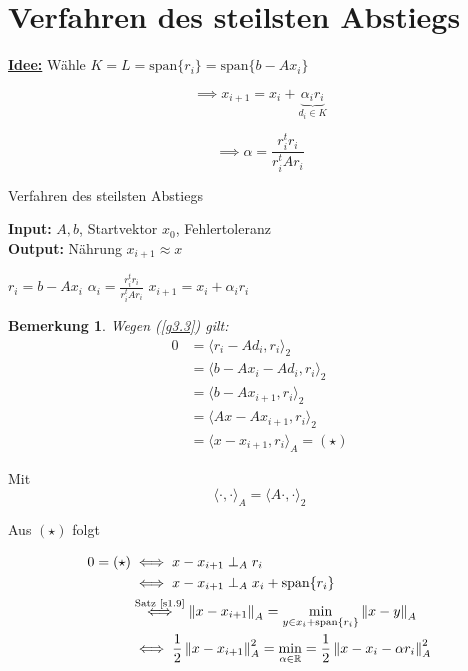 \documentclass{book}
\newtheorem{remark}[algorithm]{Bemerkung}
\def\R{\mathbb{R}}
\begin{document}
        \section{Verfahren des steilsten Abstiegs}

            \underline{\textbf{Idee:}} Wähle $K=L=\text{span}\{r_i\}=\text{span}\{b-Ax_i\}$

            \[\implies x_{i+1}=x_i+\underbrace{\alpha_i r_i}_{d_i\in K}\]

            \[\implies \alpha = \frac{r_i^tr_i}{r_i^tAr_i}\]
            
            \begin{algorithm}[H]
                \caption{Verfahren des steilsten Abstiegs}\label{a3.5}
                \textbf{Input:} $A,b$, Startvektor $x_0$, Fehlertoleranz\\
                \textbf{Output:} Nährung $x_{i+1}\approx x$
                \begin{algorithmic}
                 
                    \State $r_i=b-Ax_i$
                    \State $\alpha_i= \frac{r_i^tr_i}{r_i^tAr_i}$
                    \State $x_{i+1}=x_i+\alpha_i r_i$
                \EndWhile
                \end{algorithmic}
            \end{algorithm}

            \begin{remark}\label{b3.6}
                Wegen (\ref{g3.3}) gilt:
                \begin{align*}
                    0&=\langle r_i-Ad_i,r_i \rangle_2\\
                    &=\langle b-Ax_i-Ad_i,r_i \rangle_2\\
                    &=\langle b-Ax_{i+1},r_i \rangle_2\\
                    &= \langle Ax-Ax_{i+1}, r_i\rangle_2\\
                    &= \langle x-x_{i+1}, r_i\rangle_A = (\star)
                \end{align*}
            \end{remark}

            Mit 
            \[
                \langle \cdot,\cdot \rangle_A=\langle A\cdot,\cdot \rangle_2
            \]

            Aus $(\star)$ folgt 

            \begin{align*}
                0=(\star) &\iff x-x_{i+1} \perp_A r_i \\
                &\iff x-x_{i+1} \perp_A x_i+\text{span}\{r_i\}\\
                &\stackrel{\text{Satz \ref*{s1.9}}}{\iff} \left\Vert x-x_{i+1} \right\Vert_A=\min_{y\in x_i+\text{span}\{r_i\}} \left\Vert x-y \right\Vert_A\\
                &\iff \frac{1}{2} \left\Vert x-x_{i+1}  \right\Vert_A^2 = \min_{\alpha\in \R}=\frac{1}{2} \left\Vert  x-x_i-\alpha r_i \right\Vert_A^2
            \end{align*}
\end{document}
